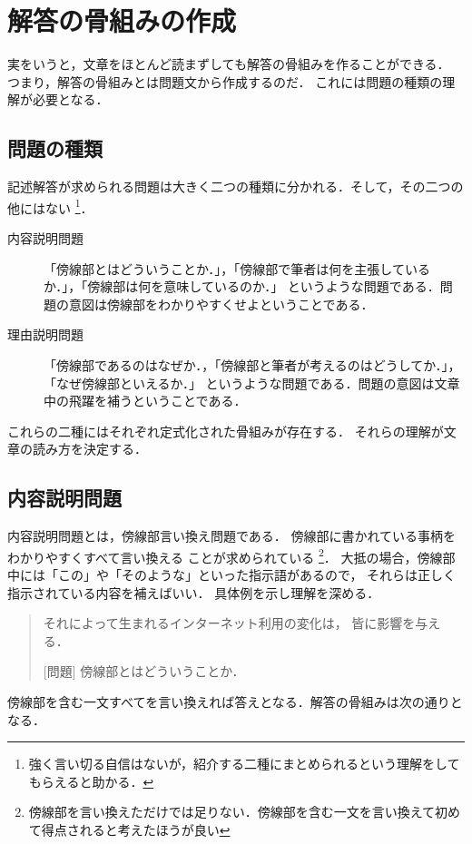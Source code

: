 \documentclass{tarticle}
\begin{document}
	\section{解答の骨組みの作成}
	実をいうと，文章をほとんど読まずしても解答の骨組みを作ることができる．
	つまり，解答の骨組みとは問題文から作成するのだ．
	これには問題の種類の理解が必要となる．

	\subsection{問題の種類}
	記述解答が求められる問題は大きく二つの種類に分かれる．そして，その二つの他にはない
	\footnote{強く言い切る自信はないが，紹介する二種にまとめられるという理解をしてもらえると助かる．}．

	\begin{description}
		\item[内容説明問題] 「傍線部とはどういうことか．」，「傍線部で筆者は何を主張しているか．」，「傍線部は何を意味しているのか．」
			というような問題である．問題の意図は傍線部をわかりやすくせよということである．
		\item[理由説明問題] 「傍線部であるのはなぜか．，「傍線部と筆者が考えるのはどうしてか．」，「なぜ傍線部といえるか．」
			というような問題である．問題の意図は文章中の飛躍を補うということである．
	\end{description}


	これらの二種にはそれぞれ定式化された骨組みが存在する．
	それらの理解が文章の読み方を決定する．

	\subsection{内容説明問題}
	内容説明問題とは，傍線部言い換え問題である．
	傍線部に書かれている事柄をわかりやすくすべて言い換える
	ことが求められている
	\footnote{傍線部を言い換えただけでは足りない．傍線部を含む一文を言い換えて初めて得点されると考えたほうが良い}．
	大抵の場合，傍線部中には「この」や「そのような」といった指示語があるので，
	それらは正しく指示されている内容を補えばいい．
	具体例を示し理解を深める．

	\begin{quotation}
		それによって生まれるインターネット利用の変化は， 皆に影響を与える．

		[問題] 傍線部とはどういうことか．
	\end{quotation}

	傍線部を含む一文すべてを言い換えれば答えとなる．解答の骨組みは次の通りとなる．
\end{document}
